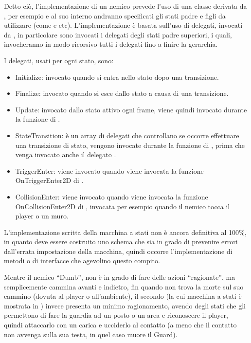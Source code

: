 Detto ciò, l'implementazione di un nemico prevede l'uso di una classe derivata da , per esempio  e al suo interno andranno specificati gli stati padre e figli da utilizzare (come  e  etc). L'implementazione è basata sull'uso di delegati, invocati da , in particolare sono invocati i delegati degli stati padre superiori, i quali, invocheranno in modo ricorsivo tutti i delegati fino a finire la gerarchia. 

I delegati, usati per ogni stato, sono:

\begin{itemize}

\item Initialize: invocato quando si entra nello stato dopo una transizione.
\item Finalize: invocato quando si esce dallo stato a causa di una transizione.
\item Update: invocato dallo stato attivo ogni frame, viene quindi invocato durante la funzione  di .
\item StateTransition: è un array di delegati che controllano se occorre effettuare una transizione di stato, vengono invocate durante la funzione  di , prima che venga invocato anche il delegato .
\item TriggerEnter: viene invocato quando viene invocata la funzione OnTriggerEnter2D di .
\item CollisionEnter: viene invocato quando viene invocata la funzione OnCollisionEnter2D di , invocata per esempio quando il nemico tocca il player o un muro.

\end{itemize}

L'implementazione scritta della macchina a stati non è ancora definitiva al 100\%, in quanto deve essere costruito uno schema che sia in grado di prevenire errori dall'errata impostazione della macchina, quindi occorre l'implementazione di metodi o di interfacce che agevolino questo compito.

Mentre il nemico ``Dumb'', non è in grado di fare delle azioni ``ragionate'', ma semplicemente cammina avanti e indietro, fin quando non trova la morte sul suo cammino (dovuta al player o all'ambiente), il secondo (la cui macchina a stati è mostrata in \myfig{\ref{fig:gerarchiaAIGuard}} ) invece presenta un minimo ragionamento, avendo degli stati che gli permettono di fare la guardia ad un posto o un area e riconoscere il player, quindi attaccarlo con un carica e ucciderlo al contatto (a meno che il contatto non avvenga sulla sua testa, in quel caso muore il Guard).

